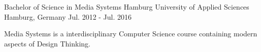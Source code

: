 

\begin{cventries}

  \cventry
    {Bachelor of Science in Media Systems}
    {Hamburg University of Applied Sciences}
    {Hamburg, Germany}
    {Jul. 2012 - Jul. 2016}
    {
      \begin{cvitems}
        \item {Media Systems is a interdisciplinary Computer Science course containing modern aspects of Design Thinking. }
      \end{cvitems}
    }

\end{cventries}
